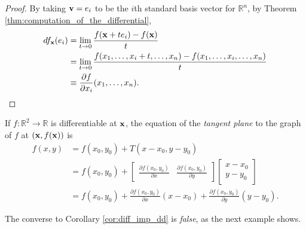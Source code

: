 \documentclass[12pt,letterpaper,reqno]{article}
\numberwithin{equation}{section}
\newcommand{\R}{\ensuremath{\mathbb R}}
\newcommand{\bv}{{\bf v}}
\newcommand{\bx}{{\bf x}}
\begin{document}
{\begin{proof}
	By taking $\bv=e_i$ to be the $i$th standard basis vector for $\R^n$, by Theorem \ref{thm:computation_of_the_differential},
	\begin{align*}
		df_\bx(e_i)&=\lim_{t \to 0}\frac{f(\bx+te_i)-f(\bx)}{t}\\
		&=\lim_{t \to 0}\frac{f(x_1,\dots,x_i+t,\dots,x_n)-f(x_1,\dots,x_i,\dots,x_n)}{t}\\
		&\equiv \frac{\partial f}{\partial x_i}(x_1,\dots,x_n).
	\end{align*}
\end{proof}

If $f:\R^2 \to \R$ is differentiable at $\bx$, the equation of the \emph{tangent plane} to the graph of $f$ at $(\bx,f(\bx))$ is 
\begin{align*}
	f(x,y)&=f(x_0,y_0)+T(x-x_0,y-y_0) \\
	&=f(x_0,y_0)+\begin{bmatrix}
		\frac{\partial f(x_0,y_0)}{\partial x} & \frac{\partial f(x_0,y_0)}{\partial y} 
	\end{bmatrix}\begin{bmatrix}
		x-x_0 \\ y-y_0
	\end{bmatrix} \\
	&=f(x_0,y_0)+\frac{\partial f(x_0,y_0)}{\partial x}(x-x_0)+\frac{\partial f(x_0,y_0)}{\partial y}(y-y_0).
\end{align*}

The converse to Corollary \ref{cor:diff_imp_dd} is \emph{false}, as the next example shows.

}
\end{document}
